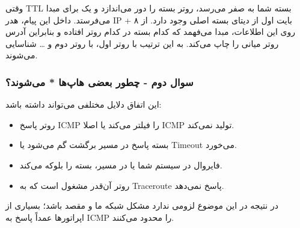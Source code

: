 وقتی TTL بسته شما به صفر می‌رسد، روتر بسته را دور می‌اندازد و یک
 برای مبدا می‌فرستد. داخل این پیام، هدر IP + ۸ بایت اول
از دیتای بسته اصلی وجود دارد. از روی این اطلاعات، مبدا می‌فهمد که کدام بسته در کدام روتر افتاده و بنابراین
آدرس روتر میانی را چاپ می‌کند. به این ترتیب با  روتر اول، با 
روتر دوم و … شناسایی می‌شوند.

\subsubsection*{سوال دوم - چطور بعضی هاپ‌ها * می‌شوند؟}


این اتفاق دلایل مختلفی می‌تواند داشته باشد:

\begin{itemize}
	\item 
	روتر پاسخ ICMP را فیلتر می‌کند یا اصلا ICMP تولید نمی‌کند.
	\item
	بسته پاسخ در مسیر برگشت گم می‌شود یا Timeout می‌خورد.
	\item 
	فایروال در سیستم شما یا در مسیر، بسته را بلوکه می‌کند.
	\item 
	روتر آن‌قدر مشغول است که به Traceroute پاسخ نمی‌دهد.
\end{itemize}


در نتیجه در این موضوع لزومی ندارد مشکل شبکه ما و مقصد باشد؛ بسیاری از
اپراتورها عمداً پاسخ به ICMP را محدود می‌کنند.







